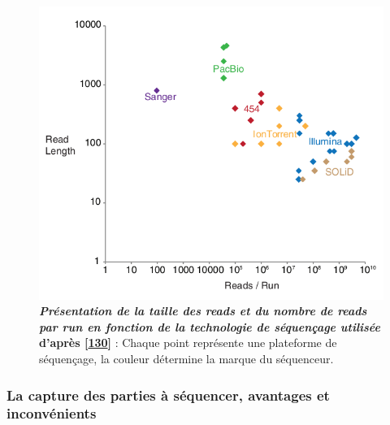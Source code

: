 \documentclass[12pt,a4paper,twoside]{ugathesis}
\theoremstyle{definition}
\theoremstyle{definition}
\theoremstyle{definition}
\theoremstyle{remark}
\begin{document}
\begin{figure}

{\centering \includegraphics[scale=.55]{figure/read_per_run} 

}

\caption[Présentation de la taille des reads et du nombre de reads par run en fonction de la technologie de séquençage utilisée]{\textbf{\emph{Présentation de la taille des reads
et du nombre de reads par run en fonction de la technologie de
séquençage utilisée} d'après
{[}\protect\hyperlink{ref-Hodkinson2015}{130}{]}} : Chaque point
représente une plateforme de séquençage, la couleur détermine la marque
du séquenceur.}\label{fig:pictreadPerRun}
\end{figure}








\subsubsection{La capture des parties à séquencer, avantages et
inconvénients}\label{la-capture-des-parties-a-sequencer-avantages-et-inconvenients}
\end{document}
